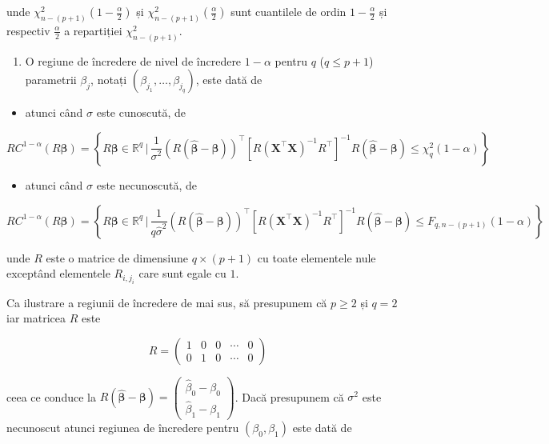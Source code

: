 \documentclass[]{article}
\providecommand{\tightlist}{%
  \setlength{\itemsep}{0pt}\setlength{\parskip}{0pt}}
\begin{document}
unde \(\chi^2_{n - (p+1)}\left(1-\frac{\alpha}{2}\right)\) și
\(\chi^2_{n - (p+1)}\left(\frac{\alpha}{2}\right)\) sunt cuantilele de
ordin \(1-\frac{\alpha}{2}\) și respectiv \(\frac{\alpha}{2}\) a
repartiției \(\chi^2_{n - (p+1)}\).

\begin{enumerate}
\def\labelenumi{\arabic{enumi})}
\setcounter{enumi}{2}
\tightlist
\item
  O regiune de încredere de nivel de încredere \(1-\alpha\) pentru \(q\)
  (\(q\leq p+1\)) parametrii \(\beta_j\), notați
  \((\beta_{j_1},\ldots,\beta_{j_q})\), este dată de
\end{enumerate}

\begin{itemize}
\tightlist
\item
  atunci când \(\sigma\) este cunoscută, de
\end{itemize}

\[
  RC^{1-\alpha}(R\boldsymbol \beta) = \left\{R\boldsymbol \beta\in\mathbb{R}^q\,|\, \frac{1}{\sigma^2}\left(R(\hat{\boldsymbol\beta} - \boldsymbol\beta)\right)^\intercal\left[R(\boldsymbol X^\intercal\boldsymbol X)^{-1}R^\intercal\right]^{-1}R(\hat{\boldsymbol\beta} - \boldsymbol\beta) \leq \chi^2_q(1-\alpha)\right\}
\]

\begin{itemize}
\tightlist
\item
  atunci când \(\sigma\) este necunoscută, de
\end{itemize}

\[
  RC^{1-\alpha}(R\boldsymbol \beta) = \left\{R\boldsymbol \beta\in\mathbb{R}^q\,|\, \frac{1}{q\hat{\sigma}^2}\left(R(\hat{\boldsymbol\beta} - \boldsymbol\beta)\right)^\intercal\left[R(\boldsymbol X^\intercal\boldsymbol X)^{-1}R^\intercal\right]^{-1}R(\hat{\boldsymbol\beta} - \boldsymbol\beta) \leq F_{q, n - (p+1)}(1-\alpha)\right\}
\]

unde \(R\) este o matrice de dimensiune \(q\times(p+1)\) cu toate
elementele nule exceptând elementele \(R_{i,j_i}\) care sunt egale cu
\(1\).

Ca ilustrare a regiunii de încredere de mai sus, să presupunem că
\(p\geq 2\) și \(q = 2\) iar matricea \(R\) este

\[
  R = \begin{pmatrix}1 & 0 & 0 & \cdots & 0\\
  0 & 1 & 0 & \cdots & 0\end{pmatrix}
\]

ceea ce conduce la
\(R(\hat{\boldsymbol\beta} - \boldsymbol\beta) = \begin{pmatrix}\hat{\beta}_0 - \beta_0\\ \hat{\beta}_1 - \beta_1\end{pmatrix}\).
Dacă presupunem că \(\sigma^2\) este necunoscut atunci regiunea de
încredere pentru \((\beta_0,\beta_1)\) este dată de
\end{document}
